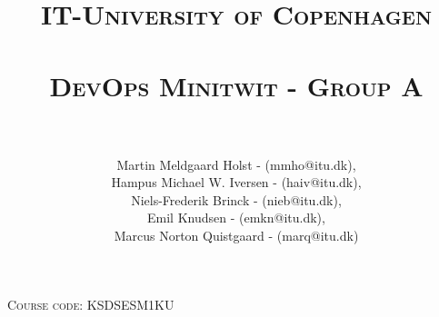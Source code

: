 \documentclass{article}
\title{
\textsc{\huge IT-University of Copenhagen}\\[1cm]\\
\textsc{\LARGE \textbf{DevOps Minitwit - Group A}}\\[1cm]\\
}
\author{
Martin Meldgaard Holst - (mmho@itu.dk),\\
Hampus Michael W. Iversen - (haiv@itu.dk), \\
Niels-Frederik Brinck - (nieb@itu.dk),\\
Emil Knudsen - (emkn@itu.dk),\\
Marcus Norton Quistgaard - (marq@itu.dk)}
\begin{document}
\maketitle
\begin{center}
\textsc{Course code: KSDSESM1KU}
\end{center}

\newpage
\tableofcontents
\newpage


\newpage

\newpage

\newpage


\newpage
\printbibliography
\end{document}
